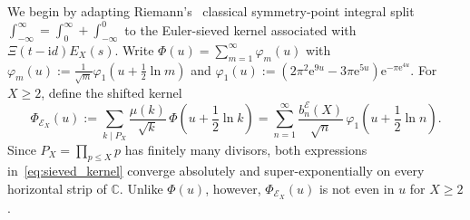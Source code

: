 \documentclass[11pt,reqno]{amsart}
\theoremstyle{plain}
\theoremstyle{definition}
\theoremstyle{remark}
\numberwithin{equation}{section}
\newcommand{\ii}{\mathrm{i}}
\newcommand{\ee}{\mathrm{e}}
\begin{document}
We begin by adapting Riemann's~\cite{riemann1859} classical symmetry-point integral split $\int_{-\infty}^{\infty} = \int_0^{\infty} + \int_{-\infty}^0$ to the Euler-sieved kernel associated with $\Xi(t - \ii d)E_X(s)$. Write $\Phi(u) = \sum_{m=1}^{\infty}\varphi_m(u)$ with $\varphi_m(u) := \frac{1}{\sqrt{m}}\varphi_1(u + \frac{1}{2}\ln m)$ and $\varphi_1(u) := (2\pi^2\ee^{9u} - 3\pi\ee^{5u})\ee^{-\pi\ee^{4u}}$. For $X \ge 2$, define the shifted kernel
\begin{equation}\label{eq:sieved_kernel}
\Phi_{\mathcal{E}_X}(u) := \sum_{k \mid P_X} \frac{\mu(k)}{\sqrt{k}}\,\Phi\!\left(u + \frac{1}{2}\ln k\right) = \sum_{n=1}^{\infty} \frac{b_n^{\mathcal{E}}(X)}{\sqrt{n}}\,\varphi_1\!\left(u + \frac{1}{2}\ln n\right).
\end{equation}
Since $P_X = \prod_{p \le X} p$ has finitely many divisors, both expressions in~\eqref{eq:sieved_kernel} converge absolutely and super-exponentially on every horizontal strip of $\mathbb{C}$. Unlike $\Phi(u)$, however, $\Phi_{\mathcal{E}_X}(u)$ is not even in $u$ for $X \ge 2$.
\end{document}
